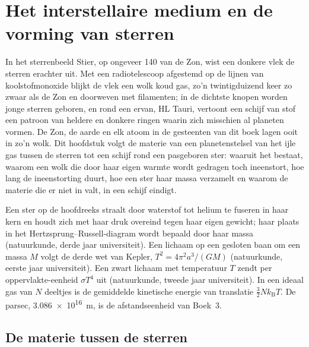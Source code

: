 \chapter{Het interstellaire medium en de vorming van sterren}\label{ch:b2:ism-star-formation}

In het sterrenbeeld Stier, op ongeveer \qty{140}{\parsec} van de Zon, wist een donkere
vlek de sterren erachter uit. Met een radiotelescoop afgestemd op de
lijnen van koolstofmonoxide blijkt de vlek een wolk koud gas, zo'n twintigduizend
keer zo zwaar als de Zon en doorweven met filamenten; in de dichtste
knopen worden jonge sterren geboren, en rond een ervan, HL Tauri, vertoont een schijf
van stof een patroon van heldere en donkere ringen waarin zich misschien al planeten
vormen. De Zon, de aarde en elk atoom in de gesteenten van dit boek lagen ooit
in zo'n wolk. Dit hoofdstuk volgt de materie van een planetenstelsel van
het ijle gas tussen de sterren tot een schijf rond een pasgeboren ster: waaruit het
 bestaat, waarom een wolk die door haar eigen warmte wordt gedragen
toch ineenstort, hoe lang de ineenstorting duurt, hoe een ster haar massa verzamelt en
waarom de materie die er niet in valt, in een schijf eindigt.

\begin{recall}
Een ster op de hoofdreeks straalt door waterstof tot helium te fuseren in haar
kern en houdt zich met haar druk overeind tegen haar eigen gewicht; haar
plaats in het Hertzsprung--Russell-diagram wordt bepaald door haar massa (natuurkunde,
derde jaar universiteit). Een lichaam op een gesloten baan om een massa $M$ volgt de derde
wet van Kepler, $T^2 = 4\pi^2 a^3/(GM)$ (natuurkunde, eerste jaar universiteit). Een zwart lichaam
met temperatuur $T$ zendt per oppervlakte-eenheid $\sigma T^4$ uit (natuurkunde, tweede jaar
universiteit). In een ideaal gas van $N$ deeltjes is de gemiddelde kinetische energie van
translatie $\tfrac32 N k_{\mathrm B} T$. De parsec,
\qty{3.086e16}{m}, is de afstandseenheid van Boek~3.
\end{recall}

\section{De materie tussen de sterren}

